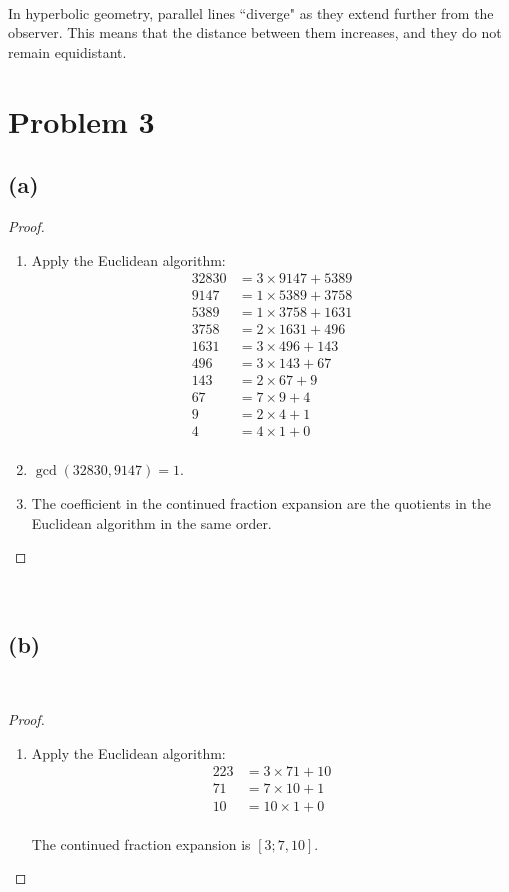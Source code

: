 \documentclass{article}
\begin{document}
~

In hyperbolic geometry, parallel lines ``diverge" as they extend further from the observer. This means that the distance between them increases, and they do not remain equidistant.

\newpage

\section*{Problem 3}

\subsection*{(a)}

\begin{proof}
~
\begin{enumerate}
    \item Apply the Euclidean algorithm:
    \begin{align*}
       32830 &= 3 \times 9147 + 5389\\
       9147 &= 1 \times 5389 + 3758\\
       5389 &=1\times3758+ 1631\\
       3758 &= 2 \times 1631 + 496\\
       1631 &= 3 \times 496 + 143\\
       496 &= 3 \times 143 + 67\\
       143 &= 2 \times 67 + 9\\
       67 &= 7 \times 9 + 4\\
       9 &= 2 \times 4 + 1\\
       4 &= 4 \times 1 + 0\\
   \end{align*}

    \item \(\gcd(32830,9147)=1\).

    \item The coefficient in the continued fraction expansion are the quotients in the Euclidean algorithm in the same order.
\end{enumerate}
\end{proof}

~

\subsection*{(b)}

~

\begin{proof}
~
\begin{enumerate}
    \item  Apply the Euclidean algorithm:
   \begin{align*}
   223 &= 3 \times 71 + 10\\
   71 &= 7 \times 10 + 1\\
   10 &= 10 \times 1 + 0\\
   \end{align*}

    The continued fraction expansion is \( [3; 7, 10] \).
\end{enumerate}
\end{proof}
\end{document}
